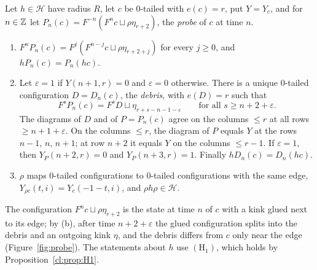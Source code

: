 \begin{lemma}\label{cl:lem:probe}
Let $h\in\mathcal H$ have radius $R$, let $c$ be $0$-tailed with $e(c)=r$, put $Y=Y_c$, and for $n\in\mathbb{Z}$ let $P_n(c)=F^{-n}(F^nc\sqcup\rho\eta_{r+2})$, the \emph{probe} of $c$ at time $n$.
\begin{enumerate}
\item[(a)] $F^nP_n(c)=F^j(F^{n-j}c\sqcup\rho\eta_{r+2+j})$ for every $j\ge0$, and $hP_n(c)=P_n(hc)$.
\item[(b)] Let $\varepsilon=1$ if $Y(n+1,r)=0$ and $\varepsilon=0$ otherwise. There is a unique $0$-tailed configuration $D=D_n(c)$, the \emph{debris}, with $e(D)=r$ such that
\[
F^sP_n(c)=F^sD\sqcup\eta_{r+s-n-1-\varepsilon}\qquad\text{for all }s\ge n+2+\varepsilon.
\]
The diagrams of $D$ and of $P=P_n(c)$ agree on the columns $\le r$ at all rows $\ge n+1+\varepsilon$. On the columns $\le r$, the diagram of $P$ equals $Y$ at the rows $n-1$, $n$, $n+1$; at row $n+2$ it equals $Y$ on the columns $\le r-1$. If $\varepsilon=1$, then $Y_P(n+2,r)=0$ and $Y_P(n+3,r)=1$. Finally $hD_n(c)=D_n(hc)$.
\item[(c)] $\rho$ maps $0$-tailed configurations to $0$-tailed configurations with the same edge, $Y_{\rho c}(t,i)=Y_c(-1-t,i)$, and $\rho h\rho\in\mathcal H$.
\end{enumerate}
\end{lemma}

The configuration $F^nc\sqcup\rho\eta_{r+2}$ is the state at time $n$ of $c$ with a kink glued next to its edge; by (b), after time $n+2+\varepsilon$ the glued configuration splits into the debris and an outgoing kink $\eta$, and the debris differs from $c$ only near the edge (Figure~\ref{fig:probe}). The statements about $h$ use $(\mathrm H_1)$, which holds by Proposition~\ref{cl:prop:H1}.

